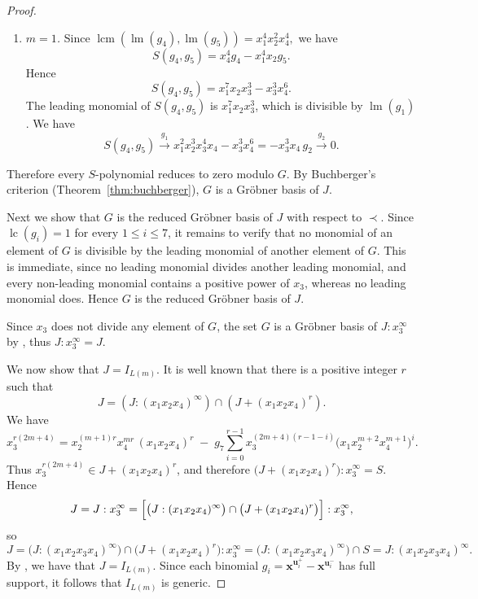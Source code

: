 \documentclass[10pt,a4paper]{amsart}
\begin{document}
\begin{proof}
\begin{enumerate}
\begin{enumerate}
\item[\textup{(b)}] \emph{$m=1$.} Since
$
\operatorname{lcm}\!\left(\operatorname{lm}(g_4),\operatorname{lm}(g_5)\right)
=
x_1^4x_2^2x_4^4,$
we have
\[
S(g_4,g_5)
=
x_4^4g_4
-
x_1^4x_2g_5.
\]
Hence
\[
S(g_4,g_5)
=
x_1^7x_2x_3^3
-
x_3^3x_4^6.
\]
The leading monomial of $S(g_4,g_5)$ is
$x_1^7x_2x_3^3$, which is divisible by
$\operatorname{lm}(g_1)$. We have
\[S(g_4,g_5)
\stackrel{g_1}{\longrightarrow}
x_1^2x_2^3x_3^4x_4
-
x_3^3x_4^6=
-x_3^3x_4\,g_2
\stackrel{g_2}{\longrightarrow}
0.
\]

\end{enumerate}

\end{enumerate}
Therefore every $S$-polynomial reduces to zero modulo $G$. By
Buchberger's criterion (Theorem~\ref{thm:buchberger}), $G$ is a
Gr\"obner basis of $J$.

Next we show that $G$ is the reduced Gr\"obner basis of $J$ with respect to $\prec$. Since $\operatorname{lc}(g_i)=1$ for every $1\le i\le7$, it remains to
verify that no monomial of an element of $G$ is divisible by the
leading monomial of another element of $G$. This is immediate, since
no leading monomial divides another leading monomial, and every
non-leading monomial contains a positive power of $x_3$, whereas no
leading monomial does. Hence $G$ is the reduced Gr\"obner basis of
$J$. 

Since $x_3$ does not divide any element of $G$, the set $G$ is a Gr\"obner basis of
$J:x_3^{\infty}$ by \cite[Lemma 12.1]{Stu}, thus $J:x_3^{\infty}=J$.

We now show that $J=I_{L(m)}$. It is well known that there is a positive integer $r$ such that $$J=(J:(x_1x_2x_4)^\infty) \cap (J+(x_1x_2x_4)^r).$$ We have \[
x_3^{r(2m+4)}
=
x_2^{(m+1)r}x_4^{mr}\,(x_1x_2x_4)^r
\;-\;
g_7\sum_{i=0}^{r-1}x_3^{(2m+4)(r-1-i)}\bigl(x_1x_2^{m+2}x_4^{m+1}\bigr)^i.
\] Thus $x_3^{r(2m+4)}\in J+(x_1x_2x_4)^r$, and therefore
$\bigl(J+(x_1x_2x_4)^r\bigr):x_3^\infty=S$. Hence
\[
J
=
J:x_3^\infty
=
\Bigl[\bigl(J:(x_1x_2x_4)^\infty\bigr)
\cap
\bigl(J+(x_1x_2x_4)^r\bigr)\Bigr]:x_3^\infty,
\] so \[
J
=
\bigl(J:(x_1x_2x_3x_4)^\infty\bigr)\cap \bigl(J+(x_1x_2x_4)^r\bigr):x_3^\infty
=\bigl(J:(x_1x_2x_3x_4)^\infty\bigr)\cap S=
J:(x_1x_2x_3x_4)^\infty.
\] By \cite[Corollary 2.5]{ES}, we have that $J=I_{L(m)}$. Since each binomial $g_i=\mathbf{x}^{\mathbf{u}_i^+}-\mathbf{x}^{\mathbf{u}_i^-}$
has full support, it follows that $I_{L(m)}$ is generic.


\end{proof}
\end{document}
